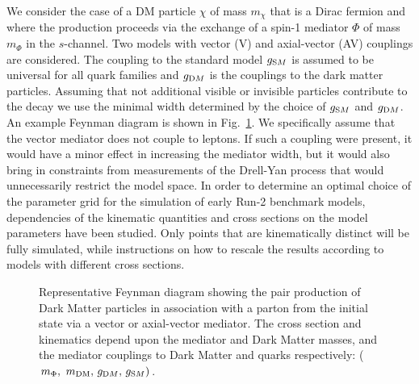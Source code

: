 We consider the case of a DM particle $\chi$ of mass $m_{\chi}$ that is a Dirac fermion and where the production proceeds via the exchange
of a spin-1 mediator $\Phi$ of mass $m_{\Phi}$ in the $s$-channel. Two models with vector (V) and axial-vector (AV) couplings are considered. The coupling to the standard model
$g_{\textrm SM}$ is assumed to be universal for all quark families and $g_{\textrm DM}$ is the couplings to the dark matter particles. Assuming that not additional visible or invisible particles contribute to the decay we use the minimal width determined by the choice of $g_{\textrm SM}$ and $g_{\textrm DM}$. An example Feynman diagram is shown in Fig.~\ref{fig:feynman}.
We specifically assume that the vector mediator does not couple to leptons. If such a coupling were present, it would have a minor effect in increasing the mediator width, but it
would also bring in constraints from measurements of the Drell-Yan process that would unnecessarily restrict the model space. 
 In order to determine an optimal choice of the parameter grid for the simulation of early Run-2 benchmark models, dependencies of the kinematic quantities and cross sections on the model parameters
have been studied. Only points that are kinematically distinct will be fully simulated, while instructions on how to rescale the results
according to models with different cross sections. 

\begin{figure}[h!]
  \centering
  \caption{Representative Feynman diagram showing the pair production of Dark Matter particles in association with a parton from the initial state via a vector or axial-vector mediator. The cross section and kinematics depend upon the mediator and Dark Matter masses, and the mediator couplings to Dark Matter and quarks respectively: ($m_{\Phi} ,\ m_\textrm{DM} ,\, g_{\textrm DM} ,\, g_{\textrm SM})$. \cite{Abercrombie:2015wmb}}
  \label{fig:feynman}
\end{figure}

